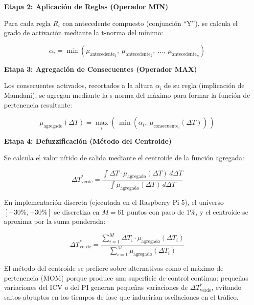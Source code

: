 \documentclass[12pt,a4paper,oneside]{report}
\begin{document}
\textbf{Etapa 2: Aplicación de Reglas (Operador MIN)}

Para cada regla \(R_{i}\) con antecedente compuesto (conjunción ``Y''), se calcula el grado de activación mediante la t-norma del mínimo:

\begin{equation}
\alpha_{i} = \min\!\left(\mu_{\text{antecedente}_{1}},\ \mu_{\text{antecedente}_{2}},\ \ldots,\ \mu_{\text{antecedente}_{n}}\right)
\label{eq:min}
\end{equation}

\textbf{Etapa 3: Agregación de Consecuentes (Operador MAX)}

Los consecuentes activados, recortados a la altura \(\alpha_{i}\) de su regla (implicación de Mamdani), se agregan mediante la s-norma del máximo para formar la función de pertenencia resultante:

\begin{equation}
\mu_{\text{agregado}}(\Delta T) = \max_{i}\left(\, \min\!\left(\alpha_{i},\ \mu_{\text{consecuente}_{i}}(\Delta T)\right) \,\right)
\label{eq:max}
\end{equation}

\textbf{Etapa 4: Defuzzificación (Método del Centroide)}

Se calcula el valor nítido de salida mediante el centroide de la función agregada:

\begin{equation}
\Delta T_{\text{verde}}^{*} = \frac{\displaystyle\int \Delta T \cdot \mu_{\text{agregado}}(\Delta T)\, d\Delta T}{\displaystyle\int \mu_{\text{agregado}}(\Delta T)\, d\Delta T}
\label{eq:centroide}
\end{equation}

En implementación discreta (ejecutada en el Raspberry Pi 5), el universo \([-30\%, +30\%]\) se discretiza en \(M = 61\) puntos con paso de \(1\%\), y el centroide se aproxima por la suma ponderada:

\begin{equation}
\Delta T_{\text{verde}}^{*} = \frac{\displaystyle\sum_{i=1}^{M} \Delta T_{i} \cdot \mu_{\text{agregado}}(\Delta T_{i})}{\displaystyle\sum_{i=1}^{M} \mu_{\text{agregado}}(\Delta T_{i})}
\label{eq:centroide-disc}
\end{equation}

El método del centroide se prefiere sobre alternativas como el máximo de pertenencia (MOM) porque produce una superficie de control continua: pequeñas variaciones del ICV o del PI generan pequeñas variaciones de \(\Delta T_{\text{verde}}^{*}\), evitando saltos abruptos en los tiempos de fase que inducirían oscilaciones en el tráfico.
\end{document}
